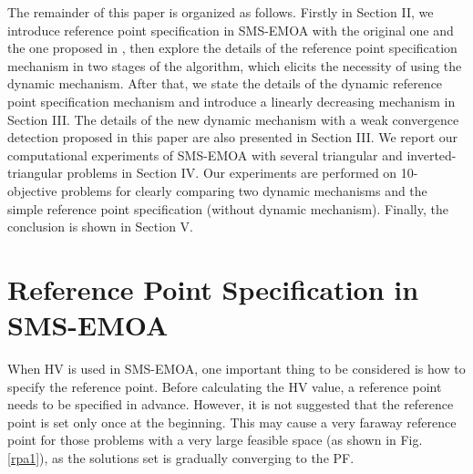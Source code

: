 \documentclass[conference]{IEEEtran}
\begin{document}
The remainder of this paper is organized as follows. 
Firstly in Section II, we introduce reference point specification in SMS-EMOA with
the original one and the one proposed in \cite{hisao:RPhowtoSpecify},
then explore the details of the reference point specification mechanism in two stages of the algorithm, 
which elicits the necessity of using the dynamic mechanism.
After that, we state the details of the dynamic reference point specification mechanism and introduce 
a linearly decreasing mechanism in Section III. 
The details of the new dynamic mechanism with a weak convergence detection proposed in this paper are also presented in Section III. 
We report our computational experiments of SMS-EMOA 
with several triangular and inverted-triangular problems in Section IV. Our experiments are performed on
10-objective problems for clearly comparing two dynamic mechanisms and the simple reference point specification (without dynamic mechanism). 
Finally, the conclusion is shown in Section V.

%
%
\section{Reference Point Specification in SMS-EMOA}
When HV is used in SMS-EMOA, 
one important thing to be considered is how to specify the reference point.
Before calculating the HV value, a reference point needs to be specified in advance.
However, it is not suggested that the reference point is set only once at the beginning. 
This may cause a very faraway reference point 
for those problems with a very large feasible space (as shown in Fig. \ref{rpa1}),
as the solutions set is gradually converging to the PF. 
\end{document}
